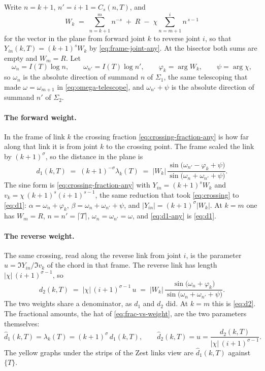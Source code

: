 \documentclass[11pt]{article}
\theoremstyle{definition}
\begin{document}
Write $n=k+1$, $n'=i+1=C_{s}(n,T)$, and
\begin{equation}\label{eq:W-any}
W_k
\;=\;
\sum_{n=k+1}^{m}n^{-s}
\;+\;R
\;-\;\chi\sum_{n=m+1}^{i}n^{\,s-1}
\end{equation}
for the vector in the plane from forward joint $k$ to reverse joint $i$, so
that $Y_{in}(k,T)=(k+1)^{s}W_k$ by \eqref{eq:frame-joint-any}. At the
bisector both sums are empty and $W_m=R$. Let
\begin{equation}\label{eq:omega-any}
\omega_n=I(T)\log n,
\qquad
\omega_{n'}=I(T)\log n',
\qquad
\varphi_k=\arg W_k,
\qquad
\psi=\arg\chi,
\end{equation}
so $\omega_n$ is the absolute direction of summand $n$ of $\Sigma_1$, the
same telescoping that made $\omega=\omega_{m+1}$ in \eqref{eq:omega-telescope},
and $\omega_{n'}+\psi$ is the absolute direction of summand $n'$ of
$\Sigma_2$.

\paragraph{The forward weight.} In the frame of link $k$ the crossing fraction
\eqref{eq:crossing-fraction-any} is how far along that link it is from joint
$k$ to the crossing point. The frame scaled the link by $(k+1)^{\sigma}$, so the distance
in the plane is
\begin{equation}\label{eq:d1-any}
d_1(k,T)
\;=\;
(k+1)^{-\sigma}\lambda_k(T)
\;=\;
|W_k|\,
\frac{\sin\!\bigl(\omega_{n'}-\varphi_k+\psi\bigr)}
     {\sin\!\bigl(\omega_n+\omega_{n'}+\psi\bigr)}.
\end{equation}
The sine form is \eqref{eq:crossing-fraction-any} with
$Y_{in}=(k+1)^{s}W_k$ and $v_k=\chi\,(k+1)^{s}(i+1)^{s-1}$, the same
reduction that took \eqref{eq:crossing} to \eqref{eq:d1}:
$\alpha=\omega_n+\varphi_k$, $\beta=\omega_n+\omega_{n'}+\psi$, and
$|Y_{in}|=(k+1)^{\sigma}|W_k|$. At $k=m$ one has $W_m=R$,
$n=n'=\lceil T\rceil$, $\omega_n=\omega_{n'}=\omega$, and
\eqref{eq:d1-any} is \eqref{eq:d1}.

\paragraph{The reverse weight.} The same crossing, read along the reverse
link from joint $i$, is the parameter
$u=\Im Y_{in}/\Im v_k$ of the chord in that frame. The reverse link has
length $|\chi|\,(i+1)^{\sigma-1}$, so
\begin{equation}\label{eq:d2-any}
d_2(k,T)
\;=\;
|\chi|\,(i+1)^{\sigma-1}\,u
\;=\;
|W_k|\,
\frac{\sin\!\bigl(\omega_n+\varphi_k\bigr)}
     {\sin\!\bigl(\omega_n+\omega_{n'}+\psi\bigr)}.
\end{equation}
The two weights share a denominator, as $d_1$ and $d_2$ did. At $k=m$ this
is \eqref{eq:d2}. The fractional amounts, the hat of
\eqref{eq:frac-vs-weight}, are the two parameters themselves:
\begin{equation}\label{eq:hat-any}
\hat d_1(k,T)=\lambda_k(T)=(k+1)^{\sigma}\,d_1(k,T),
\qquad
\hat d_2(k,T)=u=\frac{d_2(k,T)}{|\chi|\,(i+1)^{\sigma-1}}.
\end{equation}
The yellow graphs under the strips of the Zest links view are
$\hat d_1(k,T)$ against $\{T\}$.
\end{document}
